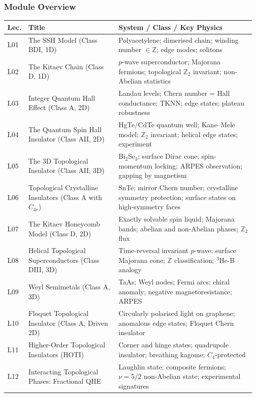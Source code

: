\documentclass[11pt,a4paper]{article}
\begin{document}
\subsubsection*{Module Overview}
{\footnotesize
\begin{center}
\begin{tabular}{@{}lp{4.2cm}p{6.8cm}@{}}
\toprule
\textbf{Lec.} & \textbf{Title} & \textbf{System / Class / Key Physics}\\
\midrule
L01 & The SSH Model (Class BDI, 1D) & Polyacetylene; dimerised chain; winding number $\in\mathbb{Z}$; edge modes; solitons\\
L02 & The Kitaev Chain (Class D, 1D) & $p$-wave superconductor; Majorana fermions; topological $\mathbb{Z}_2$ invariant; non-Abelian statistics\\
L03 & Integer Quantum Hall Effect (Class A, 2D) & Landau levels; Chern number = Hall conductance; TKNN; edge states; plateau robustness\\
L04 & The Quantum Spin Hall Insulator (Class AII, 2D) & HgTe/CdTe quantum well; Kane--Mele model; $\mathbb{Z}_2$ invariant; helical edge states; experiment\\
\midrule
L05 & The 3D Topological Insulator (Class AII, 3D) & Bi$_2$Se$_3$; surface Dirac cone; spin-momentum locking; ARPES observation; gapping by magnetism\\
L06 & Topological Crystalline Insulators (Class A with $C_{4v}$) & SnTe; mirror Chern number; crystalline symmetry protection; surface states on high-symmetry faces\\
L07 & The Kitaev Honeycomb Model (Class D, 2D) & Exactly solvable spin liquid; Majorana bands; abelian and non-Abelian phases; $\mathbb{Z}_2$ flux\\
L08 & Helical Topological Superconductors (Class DIII, 3D) & Time-reversal invariant $p$-wave; surface Majorana cone; $\mathbb{Z}$ classification; $^3$He-B analogy\\
\midrule
L09 & Weyl Semimetals (Class A, 3D) & TaAs; Weyl nodes; Fermi arcs; chiral anomaly; negative magnetoresistance; ARPES\\
L10 & Floquet Topological Insulator (Class A, Driven 2D) & Circularly polarised light on graphene; anomalous edge states; Floquet Chern insulator\\
L11 & Higher-Order Topological Insulators (HOTI) & Corner and hinge states; quadrupole insulator; breathing kagome; $C_4$-protected\\
L12 & Interacting Topological Phases: Fractional QHE & Laughlin state; composite fermions; $\nu=5/2$ non-Abelian state; experimental signatures\\
\bottomrule
\end{tabular}
\end{center}
}
\end{document}
